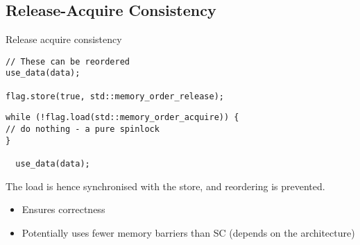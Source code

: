 \subsection{Release-Acquire Consistency}
Release acquire consistency
\\ \begin{minipage}{.49\textwidth}
\begin{verbatim}
// These can be reordered
use_data(data);

flag.store(true, std::memory_order_release);

  \end{verbatim}
\end{minipage}
\hfill
\begin{minipage}{.49\textwidth}
  \begin{verbatim}
while (!flag.load(std::memory_order_acquire)) {
// do nothing - a pure spinlock
}

  use_data(data);
  \end{verbatim}
\end{minipage}
The load is hence synchronised with the store, and reordering is prevented.
\begin{itemize}
  \item Ensures correctness
  \item Potentially uses fewer memory barriers than SC (depends on the architecture)
\end{itemize}
